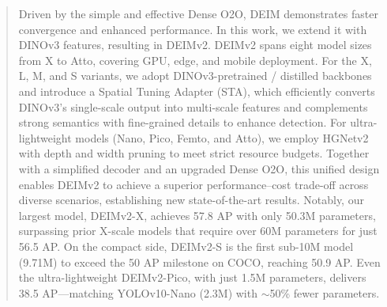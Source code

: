 \begin{abstract}
   Driven by the simple and effective Dense O2O, DEIM demonstrates faster convergence and enhanced performance. In this work, we extend it with DINOv3 features, resulting in DEIMv2. DEIMv2 spans eight model sizes from X to Atto, covering GPU, edge, and mobile deployment. For the X, L, M, and S variants, we adopt DINOv3-pretrained / distilled backbones and introduce a Spatial Tuning Adapter (STA), which efficiently converts DINOv3’s single-scale output into multi-scale features and complements strong semantics with fine-grained details to enhance detection. For ultra-lightweight models (Nano, Pico, Femto, and Atto), we employ HGNetv2 with depth and width pruning to meet strict resource budgets. Together with a simplified decoder and an upgraded Dense O2O, this unified design enables DEIMv2 to achieve a superior performance–cost trade-off across diverse scenarios, establishing new state-of-the-art results.
   Notably, our largest model, DEIMv2-X, achieves 57.8 AP with only 50.3M parameters, surpassing prior X-scale models that require over 60M parameters for just 56.5 AP. On the compact side, DEIMv2-S is the first sub-10M model (9.71M) to exceed the 50 AP milestone on COCO, reaching 50.9 AP. Even the ultra-lightweight DEIMv2-Pico, with just 1.5M parameters, delivers 38.5 AP—matching YOLOv10-Nano (2.3M) with $\sim$50\% fewer parameters. %
\end{abstract}
